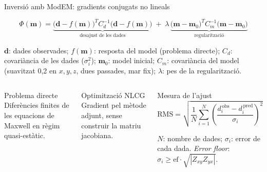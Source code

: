 \documentclass[10pt,aspectratio=169,t]{beamer}
\begin{document}
\begin{frame}{Inversió amb ModEM: gradients conjugats no lineals}
\vspace{-0.1cm}
\begin{nota}[accent]
  \normalsize\vspace{-0.3cm}
  \[
    \Phi(\symbf{m}) =
    \underbrace{\bigl(\symbf{d}-f(\symbf{m})\bigr)^{T} C_d^{-1}\bigl(\symbf{d}-f(\symbf{m})\bigr)}_{\text{desajust de les dades}}
    \;+\;
    \lambda\,\underbrace{\bigl(\symbf{m}-\symbf{m}_0\bigr)^{T} C_m^{-1}\bigl(\symbf{m}-\symbf{m}_0\bigr)}_{\text{regularització}}
  \]
  \par
  {\scriptsize\color{muted}
  $\symbf{d}$: dades observades; $f(\symbf{m})$: resposta del model (problema directe); $C_d$: covariància de les dades ($\sigma_i^2$);
  $\symbf{m}_0$: model inicial; $C_m$: covariància del model (suavitzat 0,2 en $x,y,z$, dues passades, mar fix); $\lambda$: pes de la regularització.}
\end{nota}
\vspace{0.1cm}
\begin{columns}[T,onlytextwidth]
    \begin{caixa}[muted]{Problema directe}
      Diferències finites de les equacions de Maxwell en règim quasi-estàtic.
    \end{caixa}
    \begin{caixa}[muted]{Optimització NLCG}
      Gradient pel mètode adjunt, sense construir la matriu jacobiana.
    \end{caixa}
    \begin{caixa}[accent2]{Mesura de l'ajust}
      \vspace{-0.12cm}
      \[
        \text{RMS} = \sqrt{\frac{1}{N}\sum_{i=1}^{N}\left(\frac{d_i^{\,\text{obs}}-d_i^{\,\text{pred}}}{\sigma_i}\right)^{2}}
      \]
      \par
      {\scriptsize\color{muted}$N$: nombre de dades; $\sigma_i$: error de cada dada. \textit{Error floor}: $\sigma_i \geq \mathrm{ef}\cdot\sqrt{|Z_{xy}Z_{yx}|}$.}
    \end{caixa}
\end{columns}
\end{frame}
\end{document}
